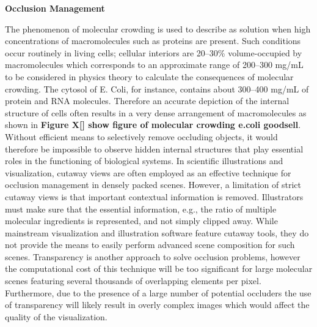 \textbf{Occlusion Management}

The phenomenon of molecular crowding is used to describe as solution when high concentrations of macromolecules such as proteins are present.
Such conditions occur routinely in living cells; cellular interiors are 20–30\% volume-occupied by macromolecules which corresponds to an approximate range of 200–300 mg/mL to be considered in physics theory to calculate the consequences of molecular crowding.
The cytosol of E. Coli, for instance, contains about 300–400 mg/mL of protein and RNA molecules.
Therefore an accurate depiction of the internal structure of cells often results in a very dense arrangement of macromolecules as shown in \textbf{Figure X[] show figure of molecular crowding e.coli goodsell}.
Without efficient means to selectively remove occluding objects, it would therefore be impossible to observe hidden internal structures that play essential roles in the functioning of biological systems.
In scientific illustrations and visualization, cutaway views are often employed as an effective technique for occlusion management in densely packed scenes.
However, a limitation of strict cutaway views is that important contextual information is removed.
Illustrators must make sure that the essential information, e.g., the ratio of multiple molecular ingredients is represented, and not simply clipped away.
While mainstream visualization and illustration software feature cutaway tools, they do not provide the means to easily perform advanced scene composition for such scenes.
Transparency is another approach to solve occlusion problems, however the computational cost of this technique will be too significant for large molecular scenes featuring several thousands of overlapping elements per pixel.
Furthermore, due to the presence of a large number of potential occluders the use of transparency will likely result in overly complex images which would affect the quality of the visualization.

